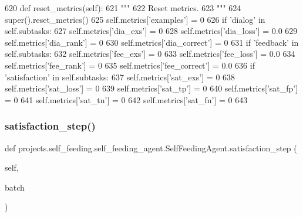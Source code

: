\begin{DoxyCode}
620     \textcolor{keyword}{def }reset\_metrics(self):
621         \textcolor{stringliteral}{"""}
622 \textcolor{stringliteral}{        Reset metrics.}
623 \textcolor{stringliteral}{        """}
624         super().reset\_metrics()
625         self.metrics[\textcolor{stringliteral}{'examples'}] = 0
626         \textcolor{keywordflow}{if} \textcolor{stringliteral}{'dialog'} \textcolor{keywordflow}{in} self.subtasks:
627             self.metrics[\textcolor{stringliteral}{'dia\_exs'}] = 0
628             self.metrics[\textcolor{stringliteral}{'dia\_loss'}] = 0.0
629             self.metrics[\textcolor{stringliteral}{'dia\_rank'}] = 0
630             self.metrics[\textcolor{stringliteral}{'dia\_correct'}] = 0
631         \textcolor{keywordflow}{if} \textcolor{stringliteral}{'feedback'} \textcolor{keywordflow}{in} self.subtasks:
632             self.metrics[\textcolor{stringliteral}{'fee\_exs'}] = 0
633             self.metrics[\textcolor{stringliteral}{'fee\_loss'}] = 0.0
634             self.metrics[\textcolor{stringliteral}{'fee\_rank'}] = 0
635             self.metrics[\textcolor{stringliteral}{'fee\_correct'}] = 0.0
636         \textcolor{keywordflow}{if} \textcolor{stringliteral}{'satisfaction'} \textcolor{keywordflow}{in} self.subtasks:
637             self.metrics[\textcolor{stringliteral}{'sat\_exs'}] = 0
638             self.metrics[\textcolor{stringliteral}{'sat\_loss'}] = 0
639             self.metrics[\textcolor{stringliteral}{'sat\_tp'}] = 0
640             self.metrics[\textcolor{stringliteral}{'sat\_fp'}] = 0
641             self.metrics[\textcolor{stringliteral}{'sat\_tn'}] = 0
642             self.metrics[\textcolor{stringliteral}{'sat\_fn'}] = 0
643 
\end{DoxyCode}
\mbox{\label{classprojects_1_1self__feeding_1_1self__feeding__agent_1_1SelfFeedingAgent_a4e504bd6e7179930122bcec4a658e30f}} 
\subsubsection{\texorpdfstring{satisfaction\+\_\+step()}{satisfaction\_step()}}
{\footnotesize\ttfamily def projects.\+self\+\_\+feeding.\+self\+\_\+feeding\+\_\+agent.\+Self\+Feeding\+Agent.\+satisfaction\+\_\+step (\begin{DoxyParamCaption}\item[{}]{self,  }\item[{}]{batch }\end{DoxyParamCaption})}



